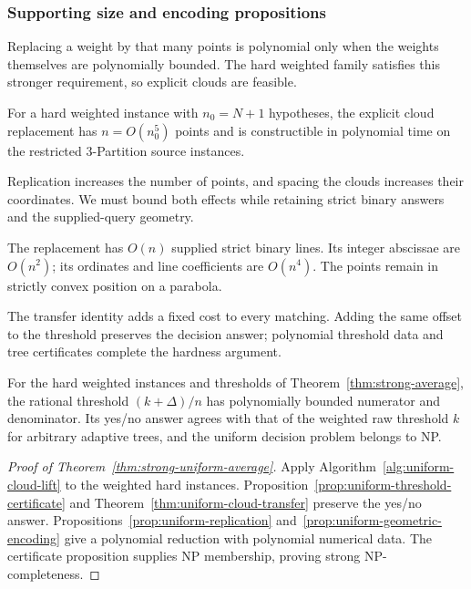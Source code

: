 \subsubsection{Supporting size and encoding propositions}

Replacing a weight by that many points is polynomial only when
the weights themselves are polynomially bounded. The hard weighted
family satisfies this stronger requirement, so explicit clouds are feasible.

\begin{proposition}
\label{prop:uniform-replication}
For a hard weighted instance with $n_0=N+1$ hypotheses, the explicit
cloud replacement has $n=O(n_0^5)$ points and is constructible in
polynomial time on the restricted 3-Partition source instances.
\end{proposition}

Replication increases the number of points, and spacing the clouds
increases their coordinates. We must bound both effects while retaining
strict binary answers and the supplied-query geometry.

\begin{proposition}
\label{prop:uniform-geometric-encoding}
The replacement has $O(n)$ supplied strict binary lines. Its integer
abscissae are $O(n^2)$; its ordinates and line coefficients are $O(n^4)$.
The points remain in strictly convex position on a parabola.
\end{proposition}

The transfer identity adds a fixed cost to every matching. Adding
the same offset to the threshold preserves the decision answer;
polynomial threshold data and tree certificates complete the hardness
argument.

\begin{proposition}
\label{prop:uniform-threshold-certificate}
For the hard weighted instances and thresholds of
Theorem~\ref{thm:strong-average}, the rational threshold
$(k+\Delta)/n$ has polynomially bounded
numerator and denominator. Its yes/no answer agrees with that of the
weighted raw threshold $k$ for arbitrary adaptive trees, and the
uniform decision problem belongs to NP.
\end{proposition}

\begin{proof}[Proof of Theorem~\ref{thm:strong-uniform-average}]
Apply Algorithm~\ref{alg:uniform-cloud-lift} to the weighted hard
instances. Proposition~\ref{prop:uniform-threshold-certificate} and
Theorem~\ref{thm:uniform-cloud-transfer} preserve the yes/no answer.
Propositions~\ref{prop:uniform-replication}
and~\ref{prop:uniform-geometric-encoding} give a polynomial reduction
with polynomial numerical data. The certificate proposition supplies
NP membership, proving strong NP-completeness.
\end{proof}

